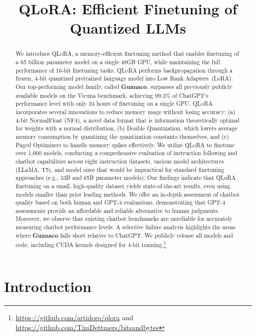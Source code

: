 \title{QLoRA: Efficient Finetuning of Quantized LLMs}

\begin{abstract}
We introduce \textsc{QLoRA}, a memory-efficient finetuning method that enables finetuning of a 65 billion parameter model on a single 48GB GPU, while maintaining the full performance of 16-bit finetuning tasks. \textsc{QLoRA} performs backpropagation through a frozen, 4-bit quantized pretrained language model into Low Rank Adapters~(LoRA). Our top-performing model family, called \textbf{Guanaco}, surpasses all previously publicly available models on the Vicuna benchmark, achieving 99.3\% of ChatGPT’s performance level with only 24 hours of finetuning on a single GPU. \textsc{QLoRA} incorporates several innovations to reduce memory usage without losing accuracy: (a) 4-bit NormalFloat (NF4), a novel data format that is information theoretically optimal for weights with a normal distribution, (b) Double Quantization, which lowers average memory consumption by quantizing the quantization constants themselves, and (c) Paged Optimizers to handle memory spikes effectively. We utilize \textsc{QLoRA} to finetune over 1,000 models, conducting a comprehensive evaluation of instruction following and chatbot capabilities across eight instruction datasets, various model architectures (LLaMA, T5), and model sizes that would be impractical for standard finetuning approaches (e.g., 33B and 65B parameter models). Our findings indicate that QLoRA finetuning on a small, high-quality dataset yields state-of-the-art results, even using models smaller than prior leading methods. We offer an in-depth assessment of chatbot quality based on both human and GPT-4 evaluations, demonstrating that GPT-4 assessments provide an affordable and reliable alternative to human judgments. Moreover, we observe that existing chatbot benchmarks are unreliable for accurately measuring chatbot performance levels. A selective failure analysis highlights the areas where \textbf{Guanaco} falls short relative to ChatGPT. We publicly release all models and code, including CUDA kernels designed for 4-bit training.\footnote{\url{https://github.com/artidoro/qlora} and \url{https://github.com/TimDettmers/bitsandbytes}}
\end{abstract}

\section{Introduction}

